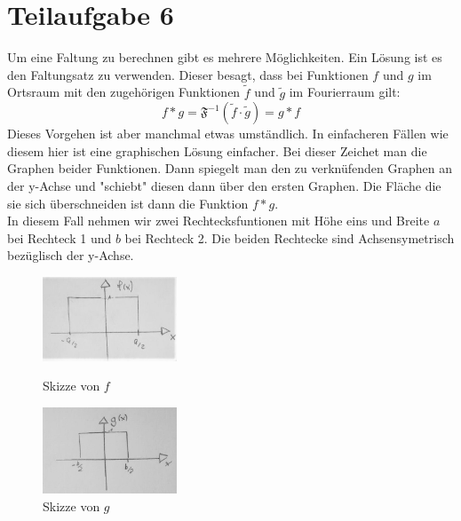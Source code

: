 

\section{Teilaufgabe 6}
Um eine Faltung zu berechnen gibt es mehrere Möglichkeiten. Ein Lösung ist es den Faltungsatz zu verwenden. Dieser besagt, dass bei Funktionen $f$ und $g$ im Ortsraum mit den 
zugehörigen Funktionen $\tilde{f}$ und $\tilde{g}$ im Fourierraum gilt:
\begin{equation}  \label{faltungssatz}
    f\ast g = \mathfrak{F}^{-1}(\tilde{f} \cdot \tilde{g}  ) = g \ast f
\end{equation}
Dieses Vorgehen ist aber manchmal etwas umständlich. In einfacheren Fällen wie diesem hier ist eine graphischen Lösung einfacher. 
Bei dieser Zeichet man die Graphen beider Funktionen. Dann spiegelt man den zu verknüfenden Graphen an der y-Achse und "schiebt" diesen dann über den ersten Graphen. 
Die Fläche die sie sich überschneiden ist dann die Funktion $f \ast g $.\\
In diesem Fall nehmen wir zwei Rechtecksfuntionen mit Höhe eins und Breite $a$ bei Rechteck 1 und $b$ bei Rechteck 2. Die beiden Rechtecke sind Achsensymetrisch bezüglisch der y-Achse.
\begin{figure}[htb]
    \centering
        \begin{minipage}[t]{0.45\linewidth}
            \centering
            \includegraphics[width=4cm]{Bilder/FzV/frage6_1.jpg}
            \caption{Skizze von $f$}
        \end{minipage}
        \hfill
        \begin{minipage}[t]{0.45\linewidth}
            \centering
            \includegraphics[width=4cm]{Bilder/FzV/frage6_2.jpg}
            \caption{Skizze von $g$}
        \end{minipage}
   
    
   \end{figure}
